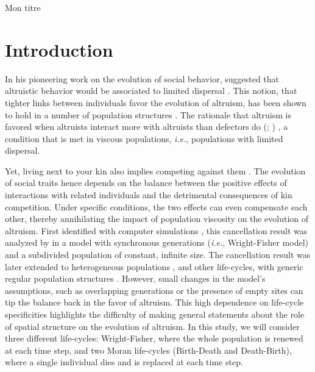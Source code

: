 \documentclass[11pt, letterpaper]{article}
\newcommand{\ie}{\textit{i.e.}}
\newcommand{\eg}{\textit{e.g.}}
\begin{document}
Mon titre 
\clearpage
\linenumbers
\pagestyle{maintext}
\section{Introduction}%
In his pioneering work on the evolution of social behavior, \citeauthor{Hamilton1964} suggested that altruistic behavior would be associated to limited dispersal \citep[p.~10]{Hamilton1964}. This notion, that tighter links between individuals favor the evolution of altruism, has been shown to hold in a number of population structures  \citep[see \eg][]{Ohtsuki2006, TaylorDayWild2007, Lehmann2007}. The rationale that altruism is favored when altruists interact more with altruists than defectors do (\citealp[p.~141]{Hamilton1975}; \citealp{Fletcher2009})%
, a condition that is met in viscous populations, \ie, populations with limited dispersal.

Yet, living next to your kin also implies competing against them \citep{West2002}. The evolution of social traits hence depends on the balance between the positive effects of interactions with related individuals and the detrimental consequences of kin competition. Under specific conditions, the two effects can even compensate each other, thereby annihilating the impact of population viscosity on the evolution of altruism. 
First identified with computer simulations \citep{Wilson1992}, this cancellation result was analyzed by \citet{Taylor1992islandmodel} in a model with synchronous generations (\ie, Wright-Fisher model) and a subdivided population of constant, infinite size. The cancellation result was later extended to heterogeneous populations \citep[][with synchronous generations and infinite population size]{RodriguesGardner2012}, and other life-cycles, with generic regular population structures \citep[][with synchronous generations but also with continuous generations and Birth-Death updating]{Taylor2011}. However, small changes in the model's assumptions, such as overlapping generations \citep{TaylorIrwin2000} or the presence of empty sites \citep{Alizon2008} can tip the balance back in the favor of altruism. 
This high dependence on life-cycle specificities highlights the difficulty of making general statements about the role of spatial structure on the evolution of altruism. 
In this study, we will consider three different life-cycles: Wright-Fisher, where the whole population is renewed at each time step, and two Moran life-cycles (Birth-Death and Death-Birth), where a single individual dies and is replaced at each time step. 
\end{document}
